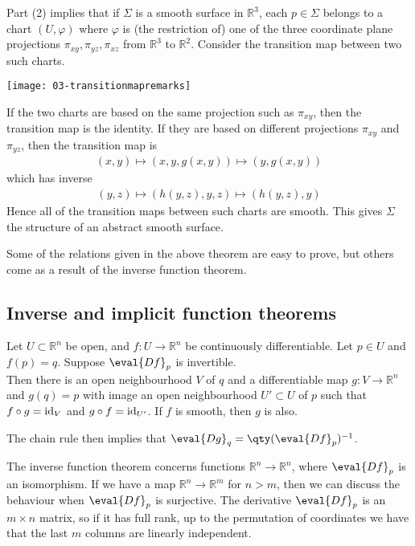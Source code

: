 \begin{remark}
	Part (2) implies that if $\Sigma$ is a smooth surface in $\mathbb R^3$, each $p \in \Sigma$ belongs to a chart $(U, \varphi)$ where $\varphi$ is (the restriction of) one of the three coordinate plane projections $\pi_{xy}, \pi_{yz}, \pi_{xz}$ from $\mathbb R^3$ to $\mathbb R^2$.
	Consider the transition map between two such charts.
	{\par
	\centering 
    \texttt{[image: 03-transitionmapremarks]} 
	\par}
	If the two charts are based on the same projection such as $\pi_{xy}$, then the transition map is the identity.
	If they are based on different projections $\pi_{xy}$ and $\pi_{yz}$, then the transition map is
	\begin{align*}
		(x,y) \mapsto (x,y,g(x,y)) \mapsto (y,g(x,y))
	\end{align*}
	which has inverse
	\begin{align*}
		(y,z) \mapsto (h(y,z),y,z) \mapsto (h(y,z),y)
	\end{align*}
	Hence all of the transition maps between such charts are smooth.
	This gives $\Sigma$ the structure of an abstract smooth surface.
\end{remark}
Some of the relations given in the above theorem are easy to prove, but others come as a result of the inverse function theorem.

\subsection{Inverse and implicit function theorems}
\begin{theorem}
	Let $U \subset \mathbb R^n$ be open, and $f \colon U \to \mathbb R^n$ be continuously differentiable.
	Let $p \in U$ and $f(p) = q$.
	Suppose $\eval{Df}_p$ is invertible. \\
	Then there is an open neighbourhood $V$ of $q$ and a differentiable map $g \colon V \to \mathbb R^n$ and $g(q) = p$ with image an open neighbourhood $U' \subset U$ of $p$ such that $f \circ g = \operatorname{id}_V$ and $g \circ f = \operatorname{id}_{U'}$.
	If $f$ is smooth, then $g$ is also.
\end{theorem}

\begin{remark}
	The chain rule then implies that $\eval{Dg}_q = \qty(\eval{Df}_p)^{-1}$.

	The inverse function theorem concerns functions $\mathbb R^n \to \mathbb R^n$, where $\eval{Df}_p$ is an isomorphism.
	If we have a map $\mathbb R^n \to \mathbb R^m$ for $n > m$, then we can discuss the behaviour when $\eval{Df}_p$ is surjective.
	The derivative $\eval{Df}_p$ is an $m \times n$ matrix, so if it has full rank, up to the permutation of coordinates we have that the last $m$ columns are linearly independent.
\end{remark}

